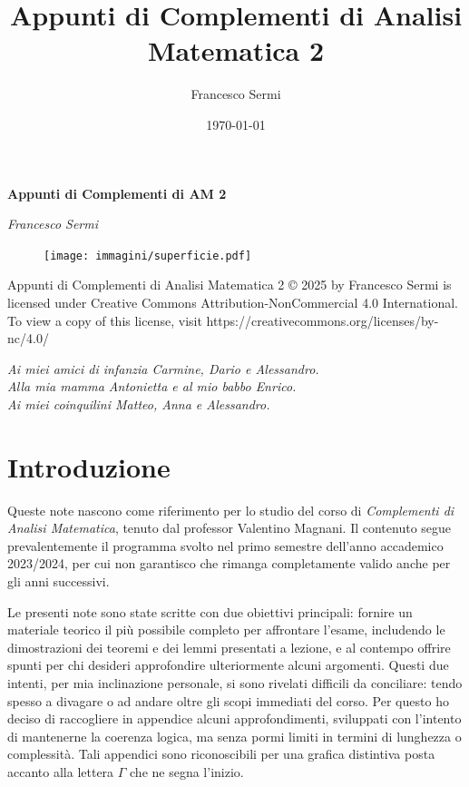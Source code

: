 \documentclass[12pt, twoside, italian]{book}
\title{Appunti di Complementi di Analisi Matematica 2}
\author{Francesco Sermi}
\date{\today}
\begin{document}
	\begin{titlepage}
	\centering
	\vspace*{3cm}
	{\huge\bfseries Appunti di Complementi di AM 2 \par}
	\vspace{2cm}
	{\Large\itshape Francesco Sermi\par}
	\vfill
	\begin{figure}[H]
    	\centering
		\texttt{[image: immagini/superficie.pdf]}
	\end{figure}
	\vfill
	\end{titlepage}
	\pagestyle{empty}
	\vspace*{\fill}
	Appunti di Complementi di Analisi Matematica 2 © 2025 by Francesco Sermi is licensed under Creative Commons Attribution-NonCommercial 4.0 International. To view a copy of this license, visit https://creativecommons.org/licenses/by-nc/4.0/
	\cleardoublepage
	\vspace*{8cm}
	\begin{center}
			\begin{flushright}
				\small\emph{Ai miei amici di infanzia Carmine, Dario e Alessandro. \\
				Alla mia mamma Antonietta e al mio babbo Enrico. \\
				Ai miei coinquilini Matteo, Anna e Alessandro. \\
				}
			\end{flushright}
		\vspace*{\fill}
	\end{center}
	\cleardoublepage
	\pagestyle{fancy}
	\tableofcontents
	\chapter*{Introduzione}
	\pagestyle{empty}
	\thispagestyle{empty}
	\pagestyle{fancy}
	Queste note nascono come riferimento per lo studio del corso di \emph{Complementi di Analisi Matematica}, tenuto dal professor Valentino Magnani. Il contenuto segue prevalentemente il programma svolto nel primo semestre dell'anno accademico 2023/2024, per cui non garantisco che rimanga completamente valido anche per gli anni successivi.\

	Le presenti note sono state scritte con due obiettivi principali: fornire un materiale teorico il più possibile completo per affrontare l'esame, includendo le dimostrazioni dei teoremi e dei lemmi presentati a lezione, e al contempo offrire spunti per chi desideri approfondire ulteriormente alcuni argomenti. Questi due intenti, per mia inclinazione personale, si sono rivelati difficili da conciliare: tendo spesso a divagare o ad andare oltre gli scopi immediati del corso. Per questo ho deciso di raccogliere in appendice alcuni approfondimenti, sviluppati con l'intento di mantenerne la coerenza logica, ma senza pormi limiti in termini di lunghezza o complessità. Tali appendici sono riconoscibili per una grafica distintiva posta accanto alla lettera $\Gamma$ che ne segna l'inizio.\
\end{document}
